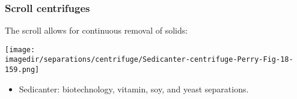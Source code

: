 % 	
% 	

% 
% 
% 
% 
% 
% 
% 
% 
% 
% 

\begin{frame}\frametitle{Scroll centrifuges}
	The scroll allows for continuous removal of solids:
	\begin{center}
		\texttt{[image: \\imagedir/separations/centrifuge/Sedicanter-centrifuge-Perry-Fig-18-159.png]}
	\end{center}
	\begin{itemize}
		\item	Sedicanter: biotechnology, vitamin, soy, and yeast separations.
	\end{itemize}
\end{frame}

